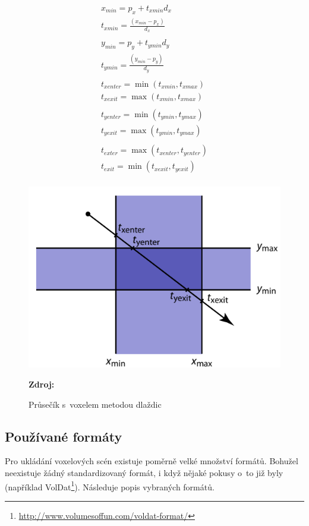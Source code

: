 \begin{equation} \label{eq:slabs}
	\begin{gathered}
		x_{min} = p_x + t_{xmin} d_x\\
		t_{xmin} = \frac{(x_{min} - p_x)}{d_x}\\
		\\
		y_{min} = p_y + t_{ymin} d_y\\
		t_{ymin} = \frac{(y_{min} - p_y)}{d_y}\\
		\\
		t_{xenter} = \min(t_{xmin}, t_{xmax})\\
		t_{xexit} = \max(t_{xmin}, t_{xmax})\\
		\\
		t_{yenter} = \min(t_{ymin}, t_{ymax})\\
		t_{yexit} = \max(t_{ymin}, t_{ymax})\\
		\\
		t_{exter} = \max(t_{xenter}, t_{yenter})\\
		t_{exit} = \min(t_{xexit}, t_{yexit})\\
	\end{gathered}
\end{equation}

\begin{figure}[H]
	\centering
	\includegraphics[scale=1.3]{obrazky-figures/slab_intersect.png}
	\caption{Průsečík s~voxelem metodou dlaždic}
	\textbf{Zdroj: \cite{Cunha13}}
	\label{fig:slabs}
\end{figure}


\subsection{Používané formáty} \label{sec:format}
Pro ukládání voxelových scén existuje poměrně velké množství formátů. Bohužel neexistuje žádný standardizovaný formát, i když nějaké pokusy o~to již byly (například VolDat\footnote{\url{http://www.volumesoffun.com/voldat-format/}}). Následuje popis vybraných formátů.

